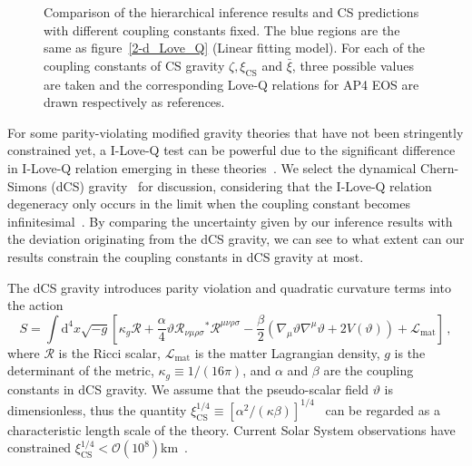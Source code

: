 \documentclass[a4paper,11pt]{article}
\begin{document}
\begin{figure}[htbp]
\begin{minipage}{0.48\linewidth}
    \end{minipage}
    \caption{Comparison of the hierarchical inference results and CS predictions with different coupling constants fixed. 
    The blue regions are the same as figure~\ref{2-d_Love_Q} (Linear fitting model). For each of the coupling constants of CS gravity 
    $\zeta, \xi_{\mathrm{CS}}$ and $\bar\xi$, three possible values are taken and the corresponding Love-Q relations 
    for AP4 EOS are drawn respectively as references.}
    \label{cs_Love_Q}
\end{figure}

For some parity-violating modified gravity theories that have not been 
stringently constrained yet, a I-Love-Q test can be powerful due to the significant difference in I-Love-Q relation emerging in these theories~\cite{Yagi_2017, Yunes:2025xwp}. 
We select the dynamical Chern-Simons (dCS) gravity~\cite{Jackiw:2003pm, Smith:2007jm, Alexander:2009tp} for discussion, considering that the I-Love-Q relation degeneracy only occurs in the limit 
when the coupling constant becomes infinitesimal~\cite{Yagi:2013bca, Yagi:2013awa, Gupta:2017vsl}.
By comparing the uncertainty given by our inference results with the deviation originating from the dCS gravity, we can see to what extent 
can our results constrain the coupling constants in dCS gravity at most.

The dCS gravity introduces parity violation and quadratic curvature terms into the action~\cite{Alexander:2009tp, Gupta:2017vsl}
\begin{equation}
    \label{cs_action}
    S = \int \mathrm{d}^4 x \sqrt{-g}\left[ \kappa_g \mathcal{R} + \frac{\alpha}{4} \mathcal{\vartheta} \mathcal{R}_{\nu\mu\rho\sigma} {}^{*}\mathcal{R}^{\mu\nu\rho\sigma} - \frac{\beta}{2}(\nabla_{\mu}\mathcal{\vartheta}\nabla^{\mu}\mathcal{\vartheta}+2V(\mathcal{\vartheta})) + \mathcal{L}_{\mathrm{mat}}\right]\,,
\end{equation}
where $\mathcal{R}$ is the Ricci scalar, $\mathcal{L}_{\mathrm{mat}}$ is the matter Lagrangian density, $g$ is the determinant of the metric, $\kappa_g\equiv 1/(16\pi)$, and $\alpha$ and $\beta$ 
are the coupling constants in dCS gravity. We assume that the pseudo-scalar field $\mathcal{\vartheta}$ is dimensionless, thus the quantity $\xi_{\mathrm{CS}}^{1/4} \equiv [\alpha^2/(\kappa\beta)]^{1/4}$ \
can be regarded as a characteristic length scale of the theory. Current Solar System observations have constrained $\xi_{\mathrm{CS}}^{1/4}< \mathcal{O}(10^8)$km~\cite{Ali-Haimoud:2011zme, Yagi:2012ya}. 
\end{document}
